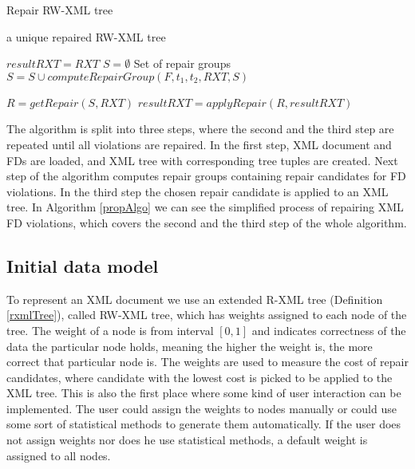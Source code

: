 \begin{algorithm}
\caption{Repair RW-XML tree}
\label{propAlgo}
\begin{algorithmic}[1]
\ENSURE a unique repaired RW-XML tree

\STATE $resultRXT = RXT$
    \STATE $S = \emptyset$ \COMMENT Set of repair groups
		    \STATE $S = S \cup computeRepairGroup(F, t_1, t_2, RXT, S)$
	    \ENDFOR
    \ENDFOR

    \STATE $R = getRepair(S, RXT)$
    \STATE $resultRXT = applyRepair(R, resultRXT)$
\ENDWHILE

\end{algorithmic}
\end{algorithm}

The algorithm is split into three steps, where the second and the third step are repeated until all violations are repaired. In the first step, XML document and FDs are loaded, and XML tree with corresponding tree tuples are created. Next step of the algorithm computes repair groups containing repair candidates for FD violations. In the third step the chosen repair candidate is applied to an XML tree. In Algorithm \ref{propAlgo} we can see the simplified process of repairing XML FD violations, which covers the second and the third step of the whole algorithm.

\subsection{Initial data model}

To represent an XML document we use an extended R-XML tree (Definition \ref{rxmlTree}), called RW-XML tree, which has weights assigned to each node of the tree. The weight of a node is from interval $[0,1]$ and indicates correctness of the data the particular node holds, meaning the higher the weight is, the more correct that particular node is. The weights are used to measure the cost of repair candidates, where candidate with the lowest cost is picked to be applied to the XML tree. This is also the first place where some kind of user interaction can be implemented. The user could assign the weights to nodes manually or could use some sort of statistical methods to generate them automatically. If the user does not assign weights nor does he use statistical methods, a default weight is assigned to all nodes.

